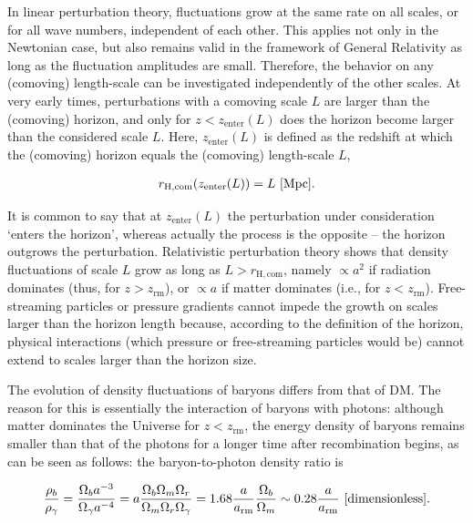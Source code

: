 \documentclass[a4paper,11pt]{article}
\begin{document}
{\noindent}In linear perturbation theory, fluctuations grow at the same rate on all scales, or for all wave numbers, independent of each other. This applies not only in the Newtonian case, but also remains valid in the framework of General Relativity as long as the fluctuation amplitudes are small. Therefore, the behavior on any (comoving) length-scale can be investigated independently of the other scales. At very early times, perturbations with a comoving scale $L$ are larger than the (comoving) horizon, and only for $z<z_\mathrm{enter}(L)$ does the horizon become larger than the considered scale $L$. Here, $z_\mathrm{enter}(L)$ is defined as the redshift at which the (comoving) horizon equals the (comoving) length-scale $L$,

\begin{align*}
    r_\mathrm{H,com}(z_\mathrm{enter}(L)) = L ~ [{\rm Mpc}].
\end{align*}

{\noindent}It is common to say that at $z_\mathrm{enter}(L)$ the perturbation under consideration `enters the horizon', whereas actually the process is the opposite -- the horizon outgrows the perturbation. Relativistic perturbation theory shows that density fluctuations of scale $L$ grow as long as $L>r_\mathrm{H,com}$, namely $\propto a^2$ if radiation dominates (thus, for $z>z_\mathrm{rm}$), or $\propto a$ if matter dominates (i.e., for $z<z_\mathrm{rm}$). Free-streaming particles or pressure gradients cannot impede the growth on scales larger than the horizon length because, according to the definition of the horizon, physical interactions (which pressure or free-streaming particles would be) cannot extend to scales larger than the horizon size.

{\noindent}The evolution of density fluctuations of baryons differs from that of DM. The reason for this is essentially the interaction of baryons with photons: although matter dominates the Universe for $z<z_\mathrm{rm}$, the energy density of baryons remains smaller than that of the photons for a longer time after recombination begins, as can be seen as follows: the baryon-to-photon density ratio is

\begin{align*}
    \frac{\rho_b}{\rho_\gamma} = \frac{\Omega_ba^{-3}}{\Omega_\gamma a^{-4}} = a\frac{\Omega_b\Omega_m\Omega_r}{\Omega_m\Omega_r\Omega_\gamma} = 1.68\frac{a}{a_\mathrm{rm}}\frac{\Omega_b}{\Omega_m} \sim 0.28\frac{a}{a_\mathrm{rm}} ~ [{\rm dimensionless}].
\end{align*}
\end{document}
